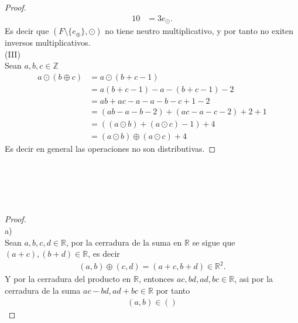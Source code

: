 \documentclass[11pt,letterpaper]{article}
\newcommand{\R}{\mathbb{R}}
\newcommand{\Z}{\mathbb{Z}}
\begin{document}
\begin{proof}
\begin{align*}
	10&=3e_\odot.
   \end{align*}
   Es decir que  $(F\setminus\{e_\oplus\},\odot)$ no tiene neutro multiplicativo, y por tanto no exiten inversos multiplicativos.\\
   (III)\\
   Sean $a,b,c\in\Z$
   \begin{align*}
	a\odot(b\oplus c)&=a\odot(b+c-1)\\
	&=a(b+c-1)-a-(b+c-1)-2\\
	&=ab+ac-a-a-b-c+1-2\\
	&=(ab-a-b-2)+(ac-a-c-2)+2+1\\
	&=((a\odot b)+(a\odot c)-1)+4\\
	&=(a\odot b)\oplus (a\odot c)+4
   \end{align*}
   Es decir en general las operaciones no son distributivas.
\end{proof}\,\\
\,\\\,\\
\begin{proof}\,\\
	a)\\
	Sean $a,b,c,d\in\R$, por la cerradura de la suma en $\R$ se  sigue que $(a+c),(b+d)\in\R$, es decir
	\begin{align*}
		(a,b)\oplus(c,d)=(a+c,b+d)\in\R^2.
	\end{align*}
	Y por la cerradura del producto en $\R$, entonces $ac,bd,ad,bc\in\R$, asi por la cerradura de la suma $ac-bd,ad+bc\in\R$
	por tanto
	\begin{align*}
		(a,b)\in()
	\end{align*}
\end{proof}\,\\
\end{document}
